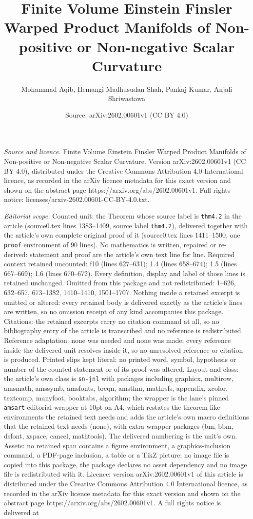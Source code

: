 \documentclass[10pt,a4paper]{amsart}
\title[Finite Volume Einstein Finsler Warped Product Manifolds of N]{Finite Volume Einstein Finsler Warped Product Manifolds of Non-positive or Non-negative Scalar Curvature}
\author{Mohammad Aqib, Hemangi Madhusudan Shah, Pankaj Kumar, Anjali Shriwastawa}
\date{Source: arXiv:2602.00601v1 (CC BY 4.0)}
\begin{document}
\maketitle

\noindent\emph{Source and licence.} Finite Volume Einstein Finsler Warped Product Manifolds of Non-positive or Non-negative Scalar Curvature. Version arXiv:2602.00601v1 (CC BY 4.0), distributed under the Creative Commons Attribution 4.0 International licence, as recorded in the arXiv licence metadata for this exact version and shown on the abstract page https://arxiv.org/abs/2602.00601v1. Full rights notice: licenses/arxiv-2602.00601-CC-BY-4.0.txt.\par\smallskip

\noindent\textit{Editorial scope.} Counted unit: the Theorem whose source label is \texttt{thm4.2} in the article (source0.tex lines 1383--1409, source label \texttt{thm4.2}), delivered together with the article's own complete original proof of it (source0.tex lines 1411--1500, one \texttt{proof} environment of 90 lines). No mathematics is written, repaired or re-derived: statement and proof are the article's own text line for line. Required context retained uncounted: f10 (lines 627--631); 1.4 (lines 658--674); 1.5 (lines 667--669); 1.6 (lines 670--672). Every definition, display and label of those lines is retained unchanged. Omitted from this package and not redistributed: 1--626, 632--657, 673--1382, 1410--1410, 1501--1707. Nothing inside a retained excerpt is omitted or altered: every retained body is delivered exactly as the article's lines are written, so no omission receipt of any kind accompanies this package. Citations: the retained excerpts carry no citation command at all, so no bibliography entry of the article is transcribed and no reference is redistributed. Reference adaptation: none was needed and none was made; every reference inside the delivered unit resolves inside it, so no unresolved reference or citation is produced. Printed slips kept literal: no printed word, symbol, hypothesis or number of the counted statement or of its proof was altered. Layout and class: the article's own class is \texttt{sn-jnl} with packages including graphicx, multirow, amsmath, amssymb, amsfonts, breqn, amsthm, mathrsfs, appendix, xcolor, textcomp, manyfoot, booktabs, algorithm; the wrapper is the lane's pinned \texttt{amsart} editorial wrapper at 10pt on A4, which restates the theorem-like environments the retained text needs and adds the article's own macro definitions that the retained text needs (none), with extra wrapper packages (bm, bbm, dsfont, xspace, cancel, mathtools). The delivered numbering is the unit's own. Assets: no retained span contains a figure environment, a graphics-inclusion command, a PDF-page inclusion, a table or a TikZ picture; no image file is copied into this package, the package declares no asset dependency and no image file is redistributed with it. Licence: version arXiv:2602.00601v1 of this article is distributed under the Creative Commons Attribution 4.0 International licence, as recorded in the arXiv licence metadata for this exact version and shown on the abstract page https://arxiv.org/abs/2602.00601v1. A full rights notice is delivered at 
\end{document}
